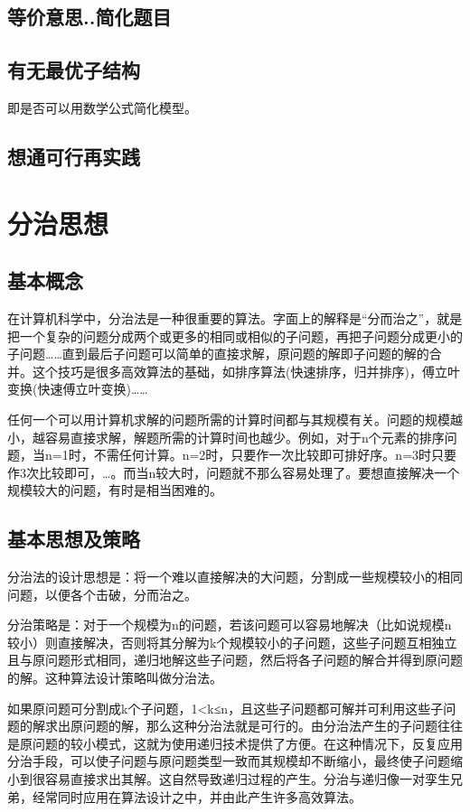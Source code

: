 \documentclass[UTF8,a4paper,12pt]{ctexbook}
\begin{document}
		\subsection{等价意思..简化题目}
		
		\subsection{有无最优子结构} 即是否可以用数学公式简化模型。
		
		\subsection{想通可行再实践}
			
	\section{分治思想}
		\subsection{基本概念}
			在计算机科学中，分治法是一种很重要的算法。字面上的解释是“分而治之”，就是把一个复杂的问题分成两个或更多的相同或相似的子问题，再把子问题分成更小的子问题……直到最后子问题可以简单的直接求解，原问题的解即子问题的解的合并。这个技巧是很多高效算法的基础，如排序算法(快速排序，归并排序)，傅立叶变换(快速傅立叶变换)……
		
			任何一个可以用计算机求解的问题所需的计算时间都与其规模有关。问题的规模越小，越容易直接求解，解题所需的计算时间也越少。例如，对于n个元素的排序问题，当n=1时，不需任何计算。n=2时，只要作一次比较即可排好序。n=3时只要作3次比较即可，…。而当n较大时，问题就不那么容易处理了。要想直接解决一个规模较大的问题，有时是相当困难的。
		
		\subsection{基本思想及策略}
			分治法的设计思想是：将一个难以直接解决的大问题，分割成一些规模较小的相同问题，以便各个击破，分而治之。
			
			分治策略是：对于一个规模为n的问题，若该问题可以容易地解决（比如说规模n较小）则直接解决，否则将其分解为k个规模较小的子问题，这些子问题互相独立且与原问题形式相同，递归地解这些子问题，然后将各子问题的解合并得到原问题的解。这种算法设计策略叫做分治法。
			
			如果原问题可分割成k个子问题，1<k≤n，且这些子问题都可解并可利用这些子问题的解求出原问题的解，那么这种分治法就是可行的。由分治法产生的子问题往往是原问题的较小模式，这就为使用递归技术提供了方便。在这种情况下，反复应用分治手段，可以使子问题与原问题类型一致而其规模却不断缩小，最终使子问题缩小到很容易直接求出其解。这自然导致递归过程的产生。分治与递归像一对孪生兄弟，经常同时应用在算法设计之中，并由此产生许多高效算法。
		
\end{document}
